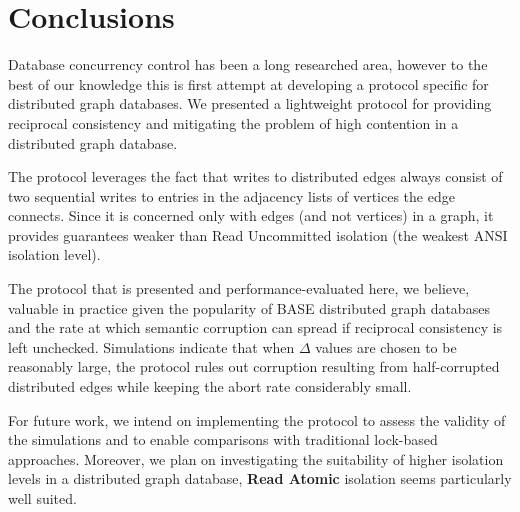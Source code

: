 \section{Conclusions}\label{sec:Conclude}

Database concurrency control has been a long researched area, however to the best of our knowledge this is first attempt at developing a protocol specific for distributed graph databases.
We presented a lightweight protocol for providing reciprocal consistency and mitigating the problem of high contention in a distributed graph database.

The \tDelta protocol leverages the fact that writes to distributed edges always consist of two sequential writes to entries in the adjacency lists of vertices the edge connects.
Since it is concerned only with edges (and not vertices) in a graph, it provides guarantees weaker than Read Uncommitted isolation (the weakest ANSI isolation level).

The protocol that is presented and performance-evaluated here, we believe,  valuable in practice given the popularity of BASE distributed graph databases and the rate at which semantic corruption can spread if reciprocal consistency is left unchecked.
Simulations indicate that when $\Delta$ values are chosen to be reasonably large, the protocol rules out corruption resulting from half-corrupted distributed edges while keeping the abort rate considerably small.

For future work, we intend on implementing the protocol to assess the validity of the simulations and to enable comparisons with traditional lock-based approaches.
Moreover, we plan on investigating the suitability of higher isolation levels in a distributed graph database, \textbf{Read Atomic} isolation \cite{Bailis2014} seems particularly well suited.
